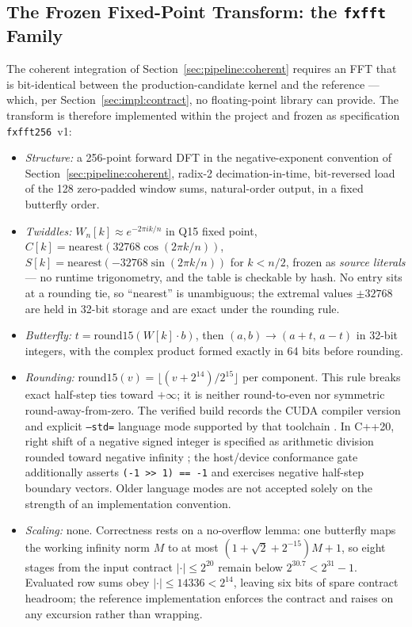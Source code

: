 \subsection{The Frozen Fixed-Point Transform: the \texttt{fxfft} Family}
\label{sec:impl:fxfft}
The coherent integration of Section~\ref{sec:pipeline:coherent} requires an FFT that is bit-identical between the production-candidate kernel and the reference --- which, per Section~\ref{sec:impl:contract}, no floating-point library can provide. The transform is therefore implemented within the project and frozen as specification \texttt{fxfft256}~v1:

\begin{itemize}
    \item \emph{Structure:} a 256-point forward DFT in the negative-exponent convention of Section~\ref{sec:pipeline:coherent}, radix-2 decimation-in-time, bit-reversed load of the 128 zero-padded window sums, natural-order output, in a fixed butterfly order.
    \item \emph{Twiddles:} $W_n[k] \approx e^{-2\pi i k/n}$ in Q15 fixed point, $C[k] = \mathrm{nearest}(32768 \cos(2\pi k/n))$, $S[k] = \mathrm{nearest}(-32768 \sin(2\pi k/n))$ for $k < n/2$, frozen as \emph{source literals} --- no runtime trigonometry, and the table is checkable by hash. No entry sits at a rounding tie, so ``nearest'' is unambiguous; the extremal values $\pm 32768$ are held in 32-bit storage and are exact under the rounding rule.
    \item \emph{Butterfly:} $t = \mathrm{round15}(W[k] \cdot b)$, then $(a, b) \to (a + t,\, a - t)$ in 32-bit integers, with the complex product formed exactly in 64 bits before rounding.
    \item \emph{Rounding:} $\mathrm{round15}(v) = \lfloor (v + 2^{14}) / 2^{15} \rfloor$ per component.  This rule breaks exact half-step ties toward $+\infty$; it is neither round-to-even nor symmetric round-away-from-zero.  The verified build records the CUDA compiler version and explicit \texttt{--std=} language mode supported by that toolchain \cite{nvidiacpp}.  In C++20, right shift of a negative signed integer is specified as arithmetic division rounded toward negative infinity \cite{cppshift}; the host/device conformance gate additionally asserts \texttt{(-1 >> 1) == -1} and exercises negative half-step boundary vectors.  Older language modes are not accepted solely on the strength of an implementation convention.
    \item \emph{Scaling:} none. Correctness rests on a no-overflow lemma: one butterfly maps the working infinity norm $M$ to at most $(1 + \sqrt{2} + 2^{-15})M + 1$, so eight stages from the input contract $|{\cdot}| \le 2^{20}$ remain below $2^{30.7} < 2^{31} - 1$. Evaluated row sums obey $|{\cdot}| \le 14336 < 2^{14}$, leaving six bits of spare contract headroom; the reference implementation enforces the contract and raises on any excursion rather than wrapping.
\end{itemize}

